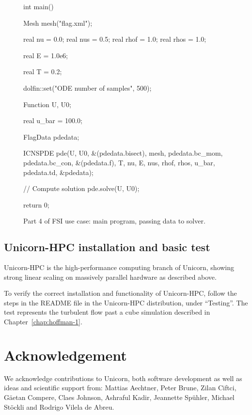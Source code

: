 \begin{figure}
\begin{c++}
int main()
{
  Mesh mesh("flag.xml");

  real nu = 0.0;
  real nus = 0.5;
  real rhof = 1.0;
  real rhos = 1.0;

  real E = 1.0e6;

  real T = 0.2;

  dolfin::set("ODE number of samples", 500);

  Function U, U0;

  real u_bar = 100.0;

  FlagData pdedata;

  ICNSPDE pde(U, U0, &(pdedata.bisect), mesh,
	      pdedata.bc_mom, pdedata.bc_con,
	      &(pdedata.f), T, nu, E, nus, rhof, rhos,
	      u_bar, pdedata.td, &pdedata);

  // Compute solution
  pde.solve(U, U0);

  return 0;
}
\end{c++}
\caption{Part 4 of FSI use case: main program, passing data to solver.}
\end{figure}

\subsection{Unicorn-HPC installation and basic test}

Unicorn-HPC is the high-performance computing branch of Unicorn, showing
strong linear scaling on massively parallel hardware as described above.

To verify the correct installation and functionality of Unicorn-HPC,
follow the steps in the README file in the Unicorn-HPC distribution,
under ``Testing''. The test represents the turbulent flow past a cube
simulation described in Chapter~\ref{chap:hoffman-1}.

\section{Acknowledgement}

We acknowledge contributions to Unicorn, both software development
as well as ideas and scientific support from: Mattias Aechtner, Peter
Brune, Zilan Ciftci, G\"aetan Compere, Claes Johnson, Ashraful Kadir,
Jeannette Sp\"uhler, Michael St\"ockli and Rodrigo Vilela de Abreu.

